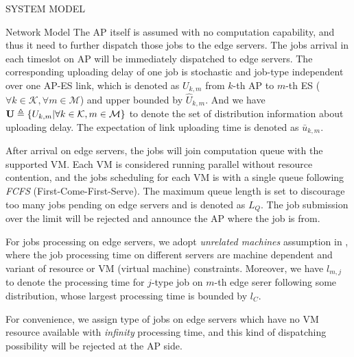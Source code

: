 \documentclass[10pt, conference, letterpaper]{IEEEtran}
\newcommand{\define}{\triangleq}
\renewcommand{\vec}{\mathbf}
\DeclarePairedDelimiter{\set}{\{}{\}}
\newcommand{\apSet}{\mathcal{K}}
\newcommand{\esSet}{\mathcal{M}}
\begin{document}
\begin{section}{SYSTEM MODEL}
\begin{subsection}{Network Model}
            The AP itself is assumed with no computation capability, and thus it need to further dispatch those jobs to the edge servers.
            The jobs arrival in each timeslot on AP will be immediately dispatched to edge servers.
            {\color{red}The corresponding uploading delay of one job is stochastic and job-type independent over one AP-ES link, which is denoted as $U_{k,m}$ from $k$-th AP to $m$-th ES ($\forall k\in\apSet, \forall m\in\esSet$) and upper bounded by $\hat{U}_{k,m}$.
            And we have $\vec{U} \define \set{U_{k,m}|\forall k\in\apSet,m\in\esSet}$ to denote the set of distribution information about uploading delay. The expectation of link uploading time is denoted as $\bar{u}_{k,m}$.}

            After arrival on edge servers, the jobs will join computation queue with the supported VM.
            Each VM is considered running parallel without resource contention, and the jobs scheduling for each VM is with a single queue following \emph{FCFS} (First-Come-First-Serve).
            {\color{red}The maximum queue length is set to discourage too many jobs pending on edge servers and is denoted as $L_Q$. The job submission over the limit will be rejected and announce the AP where the job is from.}

            {\color{red}For jobs processing on edge servers, we adopt \emph{unrelated machines} assumption in \cite{tan-online}, where the job processing time on different servers are machine dependent and variant of resource or VM (virtual machine) constraints.
            Moreover, we have $l_{m,j}$ to denote the processing time for $j$-type job on $m$-th edge serer following some distribution, whose largest processing time is bounded by $l_C$.}

            For convenience, we assign type of jobs on edge servers which have no VM resource available with \emph{infinity} processing time, and this kind of dispatching possibility will be rejected at the AP side.
        \end{subsection}


\end{section}
\end{document}
